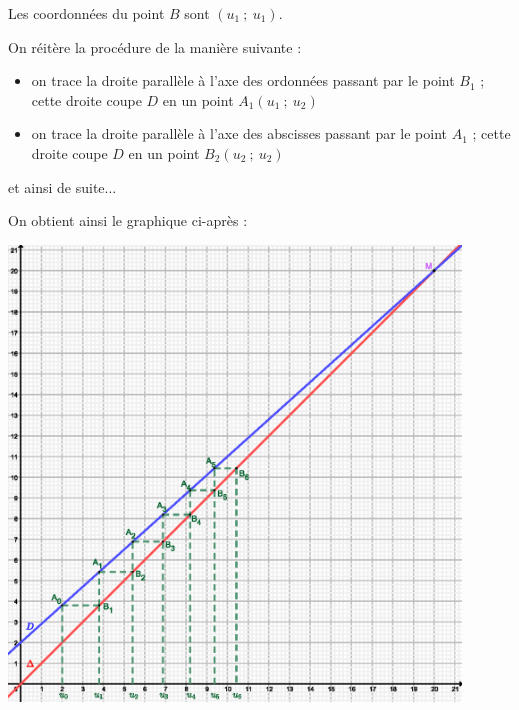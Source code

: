 \begin{corrige}
\begin{enumerate}
          Les coordonnées du point $B$ sont $(u_1~;~u_1)$.
          \par
          On réitère la procédure de la manière suivante :
          \par
          \begin{itemize}
               \item
               on trace la droite parallèle à l'axe des ordonnées passant par le point $B_1$ ; cette droite coupe $D$ en un point $A_1(u_1~;~u_2)$
               \item
               on trace la droite parallèle à l'axe des abscisses passant par le point  $A_1$ ; cette droite coupe $D$ en un point $B_2(u_2~;~u_2)$
               \par
          \end{itemize}
          \par
          et ainsi de suite...
          \par
          On obtient ainsi le graphique ci-après :
          \begin{center}
               \begin{extern}%
                    \includegraphics[width=0.9\textwidth]{images/BBESL-s3-2-2.eps}%
               \end{extern}
          \end{center}
\begin{center}

\end{center}
\end{enumerate}
\end{corrige}
